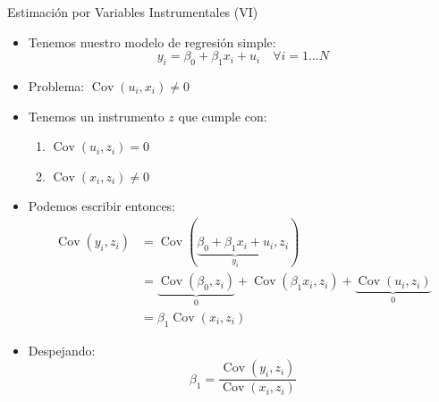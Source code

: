 \documentclass[10pt]{beamer}
\begin{document}
\begin{frame}{Estimación por Variables Instrumentales (VI)}
    \begin{itemize}
        \item Tenemos nuestro modelo de regresión simple:
        $$
        y_{i}=\beta_{0}+\beta_{1} x_{i}+u_{i} \quad \forall i=1 \ldots N
        $$
        \item Problema: $\operatorname{Cov}\left(u_{i}, x_{i}\right) \neq 0$
        \item Tenemos un instrumento $z$ que cumple con:
        \begin{enumerate}
            \item $\operatorname{Cov}\left(u_{i}, z_{i}\right)=0$
            \item $\operatorname{Cov}\left(x_{i}, z_{i}\right)\neq 0$
        \end{enumerate}
        \item Podemos escribir entonces:
        $$
        \begin{aligned}
        \operatorname{Cov}\left(y_{i}, z_{i}\right) & =\operatorname{Cov}(\underbrace{\beta_{0}+\beta_{1} x_{i}+u_{i}}_{y_{i}}, z_{i}) \\
        & =\underbrace{\operatorname{Cov}\left(\beta_{0}, z_{i}\right)}_{0}+\operatorname{Cov}\left(\beta_{1} x_{i}, z_{i}\right)+\underbrace{\operatorname{Cov}\left(u_{i}, z_{i}\right)}_{0} \\
        & =\beta_{1} \operatorname{Cov}\left(x_{i}, z_{i}\right)
        \end{aligned}
        $$
        \item Despejando:
        $$
        \beta_{1}=\frac{\operatorname{Cov}\left(y_{i}, z_{i}\right)}{\operatorname{Cov}\left(x_{i}, z_{i}\right)}
        $$
    \end{itemize}
\end{frame}
\end{document}
